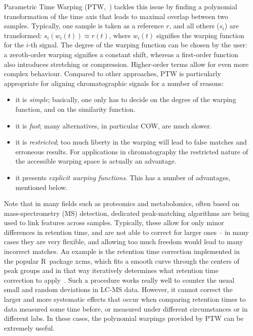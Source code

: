 \documentclass[a4paper,11pt]{article}
\newcommand{\pkg}[1]{{\normalfont\fontseries{b}\selectfont #1}}
\newcommand{\proglang}[1]{{\sffamily #1}}
\newcommand{\R}{\proglang{R}}
\begin{document}
Parametric Time Warping (PTW,~\citet{Eilers2004}) tackles this issue by
finding a polynomial transformation of the time axis that leads to
maximal overlap between two samples. Typically, one sample is taken as
a reference $r$, and all others ($s_i$) are transformed: 
$s_i(w_i(t)) \approx r(t)$, where $w_i(t)$ signifies the warping
function for the $i$-th signal. The degree of the warping function can
be chosen by the 
user: a zeroth-order warping signifies a constant shift, whereas a
first-order function also introduces stretching or
compression. Higher-order terms allow for even more complex behaviour.
Compared to other approaches, PTW is particularly appropriate for
aligning chromatographic signals for a number of reasons: 
\begin{itemize}
\item it is \emph{simple}; basically, one only has to decide on the
  degree of the warping function, and on the similarity function.
\item it is \emph{fast}; many alternatives, in particular COW, are
  much slower.
\item it is \emph{restricted}; too much liberty in the warping will lead to
  false matches and erroneous results. For applications in
  chromatography the restricted nature of the accessible warping space
  is actually an advantage.
\item it presents \emph{explicit warping functions}. This has a number
  of advantages, mentioned below.
\end{itemize}
Note that in many fields such as
proteomics and metabolomics, often based on mass-spectrometry (MS)
detection, dedicated peak-matching algorithms are
being used to link features across samples. Typically, these allow for
only minor differences in retention time, and are not able to correct
for larger ones -- in many cases they are very flexible, and allowing
too much freedom would lead to many incorrect matches. An example is
the retention time correction implemented in the popular \R\ package
\pkg{xcms}, which fits a smooth curve through the centers of peak
groups and in that way iteratively determines what retention time
correction to apply~\citep{Smith2006}. Such a procedure works really
well to counter the usual small and random deviations in LC-MS
data. However, it cannot correct the larger and more systematic
effects that occur when comparing retention times to data measured
some time before, or measured under different circumstances or in
different labs. In these cases, the polynomial warpings provided by
PTW can be extremely useful. 
\end{document}
